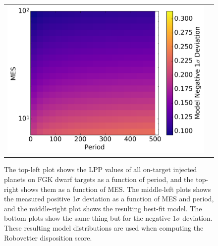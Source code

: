 \begin{figure}
\begin{tabular}{cc}
\includegraphics[width=0.5\linewidth]{ScoreFig-6.png}
\end{tabular}
\caption{The top-left plot shows the LPP values of all on-target injected planets on FGK dwarf targets as a function of period, and the top-right shows them as a function of MES. The middle-left plots shows the measured positive 1$\sigma$ deviation as a function of MES and period, and the middle-right plot shows the resulting best-fit model. The bottom plots show the same thing but for the negative 1$\sigma$ deviation. These resulting model distributions are used when computing the Robovetter disposition score.}
\label{score-fig-1}
\end{figure}
